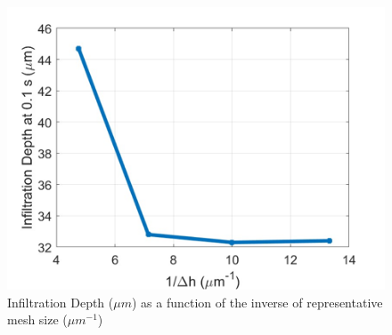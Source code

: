 \documentclass[%
 aip,
 amsmath,amssymb,
 reprint,%
]{revtex4-1}
\begin{document}

\begin{figure}
    \centering
    \includegraphics[width=\linewidth]{Figures/infilDepthMesh.png}
    \caption{Infiltration Depth ($\mu m$) as a function of the inverse of representative mesh size ($\mu m ^{-1}$)}
    \label{fig:meshSensResults}
\end{figure}
\end{document}
